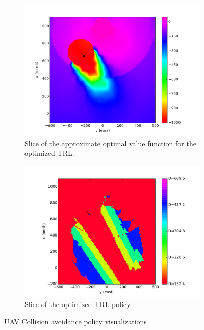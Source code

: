 \begin{figure}[p]
    \begin{subfigure}[t]{0.48\textwidth}
        \includegraphics[width=\columnwidth]{media/value.pdf}
        \caption{Slice of the approximate optimal value function for the optimized TRL.} 
        \label{fig:trlvalue}
    \end{subfigure}
    \hfill
    \begin{subfigure}[t]{0.48\textwidth}
        \includegraphics[width=\columnwidth]{media/policy.pdf}
        \caption{Slice of the optimized TRL policy.}
        \label{fig:trlpolicy}
    \end{subfigure}    
    \caption{UAV Collision avoidance policy visualizations}
\end{figure}



